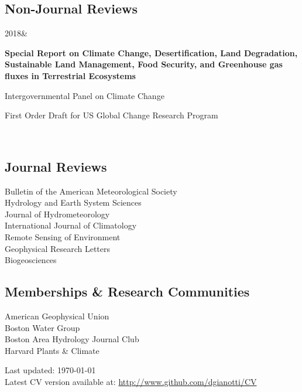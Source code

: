 \documentclass[]{friggeri-cv}
\newcommand{\lpdentry}[4]{\begin{entrylist}%
   #1&\begin{minipage}[t]{11.8cm}%
   \begin{minipage}[t]{11.8cm-0.4cm-\widthof{\begin{varwidth}{4cm} \footnotesize#3 \strut\end{varwidth}}
}\strut \raggedright\textbf{#2} \strut\end{minipage}\hfill\begin{varwidth}[t]{4cm} \footnotesize\addfontfeature{Color=lightgray}\begin{flushright}#3 \strut\end{flushright}\end{varwidth}\vspace{0.6\parsep}
  
    {\tnr\begin{hangparas}{0.25in}{1} #4\vspace{3\parsep}\end{hangparas}}%
  \end{minipage}\\\end{entrylist}}
\begin{document}
\subsection{Non-Journal Reviews}
	\lpdentry
		{2018} 
		{Special Report on Climate Change, Desertification, Land Degradation, Sustainable Land 
		Management, Food Security, and Greenhouse gas fluxes in Terrestrial Ecosystems}
		{Intergovernmental Panel on Climate Change}
		{First Order Draft for US Global Change Research Program}

\subsection{Journal Reviews}
Bulletin of the American Meteorological Society\\
Hydrology and Earth System Sciences\\
Journal of Hydrometeorology\\
International Journal of Climatology\\
Remote Sensing of Environment\\
Geophysical Research Letters\\
Biogeosciences

\subsection{Memberships \& Research Communities}
American Geophysical Union\\ %
Boston Water Group\\ %
Boston Area Hydrology Journal Club\\ %
Harvard Plants \& Climate

\vfill{}

\begin{flushright}
{\scriptsize  Last updated: \today \\
Latest CV version available at: \href{http://www.github.com/dgianotti/CV}{http://www.github.com/dgianotti/CV}}
\end{flushright}
\end{document}
